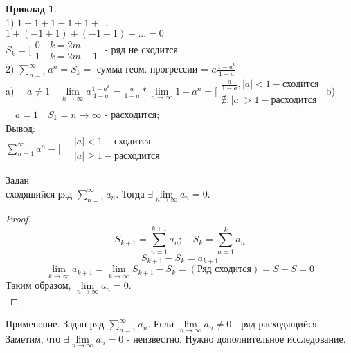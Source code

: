 \documentclass[14pt,a4paper]{scrartcl}
\theoremstyle{definition}
\newtheorem*{example}{Приклад}
\theoremstyle{remark}
\theoremstyle{definition}
\theoremstyle{definition}
\begin{document}
\begin{example}-\\
  1) $1-1+1-1+1+...$\\
  $1+(-1+1)+(-1+1)+... = 0$\\
  $
  S_k = \Bigg[
  \begin{gathered}
    0 \quad k=2m\\
    1 \quad k = 2m+1
  \end{gathered}
  $ - ряд не сходится.\\
  2)  $ \sum\limits_{n = 1}^{ \infty}{a^n} = S_k = $ сумма геом. прогрессии = $ a\displaystyle\frac{1-a^k}{1-a} $\\
  a) $ \quad a\neq 1 \quad  \lim\limits_{k\to  \infty}{a \displaystyle\frac{1-a^k}{1-a} } = \frac{a}{1-a} *  \lim\limits_{n\to  \infty}{1-a^n} = \Bigg[ \begin{gathered}
    \frac{a}{1-a}, \vert a \vert < 1 - \text{сходится}\\
    \nexists, \vert a \vert > 1 - \text{расходится}
  \end{gathered} $
  b)$\quad a = 1 \quad S_k = n \to \infty$ - расходится;\\
  Вывод:\\
  $ \sum\limits_{n = 1}^{ \infty}{a^n} - \Bigg[ \begin{gathered}
    \quad\vert a \vert < 1 - \text{сходится}\\
    \quad\vert a \vert \geq 1 - \text{расходится}
  \end{gathered}$
\end{example}
\pagebreak
\begin{boxteo}
  Задан\\ сходящийся ряд $ \sum\limits_{n = 1}^{ \infty}{a_n} $. Тогда $\exists  \lim\limits_{n\to  \infty}{a_n} = 0$.\\
\end{boxteo}
\begin{proof}
 $$S_{k+1} =  \sum\limits_{n = 1}^{ k+1}{a_n};\quad S_k =  \sum\limits_{n = 1}^{ k}{a_n}  $$
 $$S_{k+1} - S_k = a_{k+1}$$
 $$ \lim\limits_{k\to  \infty}{a_{k+1}} =   \lim\limits_{k\to  \infty}{S_{k+1}- S_k} = (\text{Ряд сходится}) = S-S = 0$$
 Таким образом, $ \lim\limits_{n\to  \infty}{a_n} = 0.$\\
\end{proof}
Применение. Задан ряд $ \sum\limits_{n = 1}^{ \infty}{a_n} $.
Если $ \lim\limits_{n\to  \infty}{a_n} \neq 0$ - ряд расходящийся.\\
Заметим, что $\exists  \lim\limits_{n\to  \infty}{a_n} = 0$ - неизвестно. Нужно дополнительное исследование.
\end{document}

